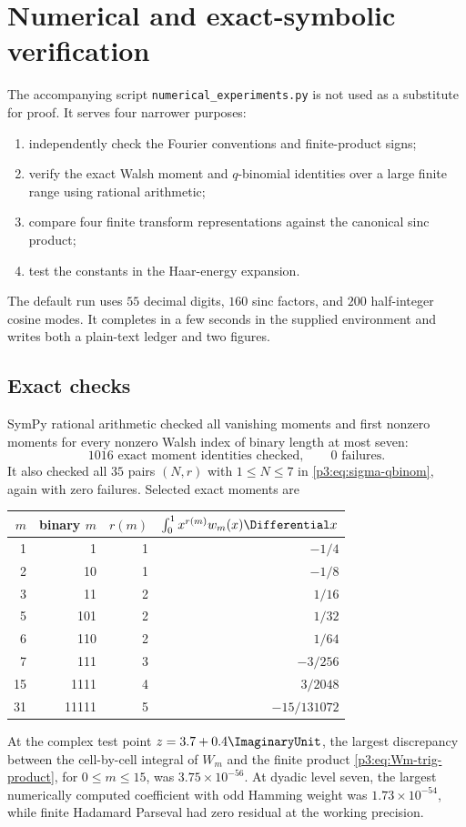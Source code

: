 \documentclass[11pt]{article}
\theoremstyle{definition}
\theoremstyle{remark}
\begin{document}
\section{Numerical and exact-symbolic verification}
\label{p3:sec:numerics}

The accompanying script \texttt{numerical\_experiments.py} is not used as a
substitute for proof.  It serves four narrower purposes:
\begin{enumerate}
\item independently check the Fourier conventions and finite-product signs;
\item verify the exact Walsh moment and $q$-binomial identities over a large
      finite range using rational arithmetic;
\item compare four finite transform representations against the canonical sinc
      product;
\item test the constants in the Haar-energy expansion.
\end{enumerate}
The default run uses $55$ decimal digits, $160$ sinc factors, and $200$
half-integer cosine modes.  It completes in a few seconds in the supplied
environment and writes both a plain-text ledger and two figures.

\subsection{Exact checks}

SymPy rational arithmetic checked all vanishing moments and first nonzero
moments for every nonzero Walsh index of binary length at most seven:
\begin{equation}\label{p3:eq:numerical-Walsh-count}
 1016\text{ exact moment identities checked},\qquad0\text{ failures}.
\end{equation}
It also checked all $35$ pairs $(N,r)$ with $1\le N\le7$ in
\eqref{p3:eq:sigma-qbinom}, again with zero failures.  Selected exact moments are
\begin{center}
\begin{tabular}{@{}rrrr@{}}
\toprule
$m$ & binary $m$ & $r(m)$ & $\int_0^1x^{r(m)}w_m(x)\Differential x$\\
\midrule
1  & 1     & 1 & $-1/4$\\
2  & 10    & 1 & $-1/8$\\
3  & 11    & 2 & $1/16$\\
5  & 101   & 2 & $1/32$\\
6  & 110   & 2 & $1/64$\\
7  & 111   & 3 & $-3/256$\\
15 & 1111  & 4 & $3/2048$\\
31 & 11111 & 5 & $-15/131072$\\
\bottomrule
\end{tabular}
\end{center}
At the complex test point $z=3.7+0.4\ImaginaryUnit$, the largest discrepancy between the
cell-by-cell integral of $W_m$ and the finite product
\eqref{p3:eq:Wm-trig-product}, for $0\le m\le15$, was
$3.75\times10^{-56}$.  At dyadic level seven, the largest numerically computed
coefficient with odd Hamming weight was $1.73\times10^{-54}$, while finite
Hadamard Parseval had zero residual at the working precision.
\end{document}
